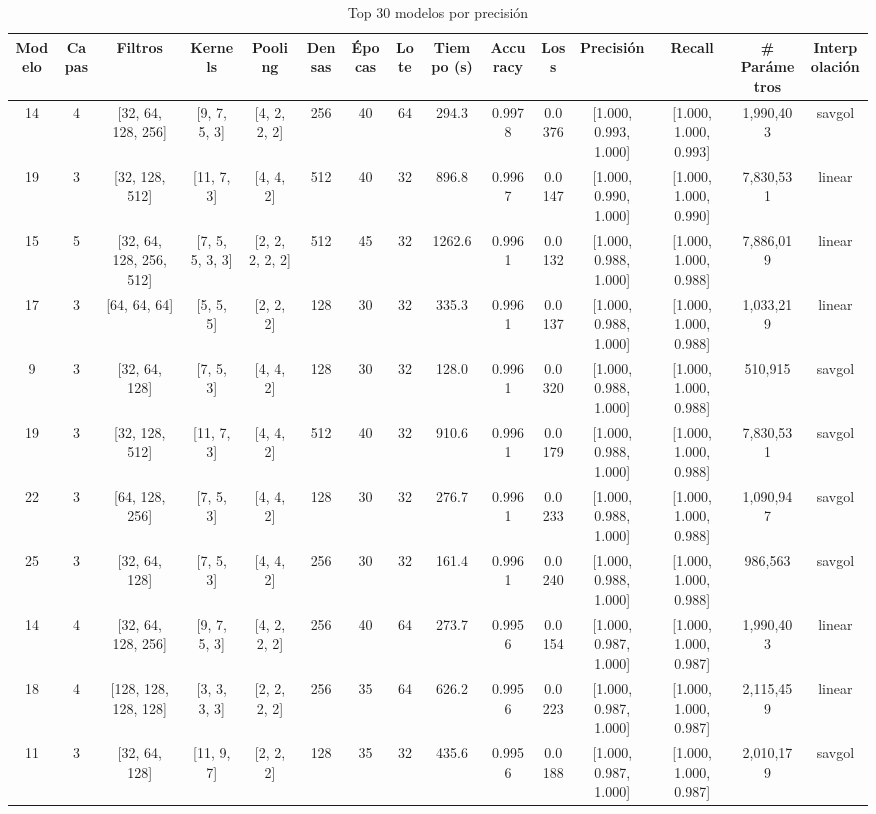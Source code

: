 \begin{table}[htbp]
\caption{Top 30 modelos por precisión}
\label{tab:top_models}
\begin{tabular}{|c|c|c|c|c|c|c|c|c|c|c|c|c|c|c|}
\toprule
Modelo & Capas & Filtros & Kernels & Pooling & Densas & Épocas & Lote & Tiempo (s) & Accuracy & Loss & Precisión & Recall & # Parámetros & Interpolación \\
\midrule
14 & 4 & [32, 64, 128, 256] & [9, 7, 5, 3] & [4, 2, 2, 2] & 256 & 40 & 64 & 294.3 & 0.9978 & 0.0376 & [1.000, 0.993, 1.000] & [1.000, 1.000, 0.993] & 1,990,403 & savgol \\
19 & 3 & [32, 128, 512] & [11, 7, 3] & [4, 4, 2] & 512 & 40 & 32 & 896.8 & 0.9967 & 0.0147 & [1.000, 0.990, 1.000] & [1.000, 1.000, 0.990] & 7,830,531 & linear \\
15 & 5 & [32, 64, 128, 256, 512] & [7, 5, 5, 3, 3] & [2, 2, 2, 2, 2] & 512 & 45 & 32 & 1262.6 & 0.9961 & 0.0132 & [1.000, 0.988, 1.000] & [1.000, 1.000, 0.988] & 7,886,019 & linear \\
17 & 3 & [64, 64, 64] & [5, 5, 5] & [2, 2, 2] & 128 & 30 & 32 & 335.3 & 0.9961 & 0.0137 & [1.000, 0.988, 1.000] & [1.000, 1.000, 0.988] & 1,033,219 & linear \\
9 & 3 & [32, 64, 128] & [7, 5, 3] & [4, 4, 2] & 128 & 30 & 32 & 128.0 & 0.9961 & 0.0320 & [1.000, 0.988, 1.000] & [1.000, 1.000, 0.988] & 510,915 & savgol \\
19 & 3 & [32, 128, 512] & [11, 7, 3] & [4, 4, 2] & 512 & 40 & 32 & 910.6 & 0.9961 & 0.0179 & [1.000, 0.988, 1.000] & [1.000, 1.000, 0.988] & 7,830,531 & savgol \\
22 & 3 & [64, 128, 256] & [7, 5, 3] & [4, 4, 2] & 128 & 30 & 32 & 276.7 & 0.9961 & 0.0233 & [1.000, 0.988, 1.000] & [1.000, 1.000, 0.988] & 1,090,947 & savgol \\
25 & 3 & [32, 64, 128] & [7, 5, 3] & [4, 4, 2] & 256 & 30 & 32 & 161.4 & 0.9961 & 0.0240 & [1.000, 0.988, 1.000] & [1.000, 1.000, 0.988] & 986,563 & savgol \\
14 & 4 & [32, 64, 128, 256] & [9, 7, 5, 3] & [4, 2, 2, 2] & 256 & 40 & 64 & 273.7 & 0.9956 & 0.0154 & [1.000, 0.987, 1.000] & [1.000, 1.000, 0.987] & 1,990,403 & linear \\
18 & 4 & [128, 128, 128, 128] & [3, 3, 3, 3] & [2, 2, 2, 2] & 256 & 35 & 64 & 626.2 & 0.9956 & 0.0223 & [1.000, 0.987, 1.000] & [1.000, 1.000, 0.987] & 2,115,459 & linear \\
11 & 3 & [32, 64, 128] & [11, 9, 7] & [2, 2, 2] & 128 & 35 & 32 & 435.6 & 0.9956 & 0.0188 & [1.000, 0.987, 1.000] & [1.000, 1.000, 0.987] & 2,010,179 & savgol \\

\end{tabular}
\end{table}

